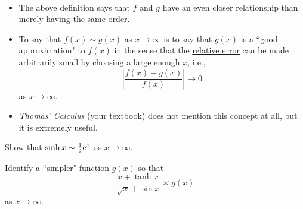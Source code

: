 \begin{remark}\,
\begin{itemize}
\item The above definition says that $f$ and $g$ have an even closer relationship than merely having the same order.
\item To say that $f(x)\sim g(x)$ as $x\to \infty$  is to say that $g(x)$ is a ``good approximation" to $f(x)$ in the sense that the \underline{relative error} can be made arbitrarily small by choosing a large enough $x$, i.e., 
\begin{equation*}
\left|\frac{f(x) - g(x)}{f(x)}\right|\to 0
\end{equation*}
as $x\to\infty$.
\item \textit{Thomas' Calculus} (your textbook) does not mention this concept at all, but it is extremely useful.
\end{itemize}
\end{remark}

\begin{example}
Show that $\sinh x\sim \frac{1}{2}\mathrm{e}^x$ as $x\to\infty$.
\end{example}
\ifdefined\SOLUTION
{}
\fi

\newpage

\begin{example}
Identify a ``simpler" function $g(x)$ so that 
\begin{equation*}
\frac{x+\tanh x}{\sqrt x + \sin x}\asymp g(x) 
\end{equation*}
as $x\to\infty$.
\end{example}
\ifdefined\SOLUTION
{}
\fi
